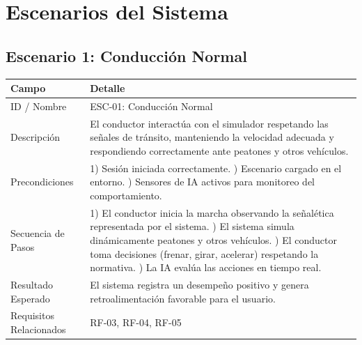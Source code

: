 \documentclass[12pt]{article}
\begin{document}
	\section{Escenarios del Sistema}
	
	\subsection{Escenario 1: Conducción Normal}
	
	\begin{longtable}{|p{4cm}|p{10cm}|}
		\hline
		\textbf{Campo} & \textbf{Detalle} \\ \hline
		
		ID / Nombre & ESC-01: Conducción Normal \\ \hline
		
		Descripción &
		El conductor interactúa con el simulador respetando las señales de tránsito, manteniendo la velocidad adecuada y respondiendo correctamente ante peatones y otros vehículos. \\ \hline
		
		Precondiciones &
		1) Sesión iniciada correctamente. \newline
		2) Escenario cargado en el entorno. \newline
		3) Sensores de IA activos para monitoreo del comportamiento. \\ \hline
		
		Secuencia de Pasos &
		1) El conductor inicia la marcha observando la señalética representada por el sistema. \newline
		2) El sistema simula dinámicamente peatones y otros vehículos. \newline
		3) El conductor toma decisiones (frenar, girar, acelerar) respetando la normativa. \newline
		4) La IA evalúa las acciones en tiempo real. \\ \hline
		
		Resultado Esperado &
		El sistema registra un desempeño positivo y genera retroalimentación favorable para el usuario. \\ \hline
		
		Requisitos Relacionados &
		RF-03, RF-04, RF-05 \\ \hline
		
	\end{longtable}
	
\end{document}
